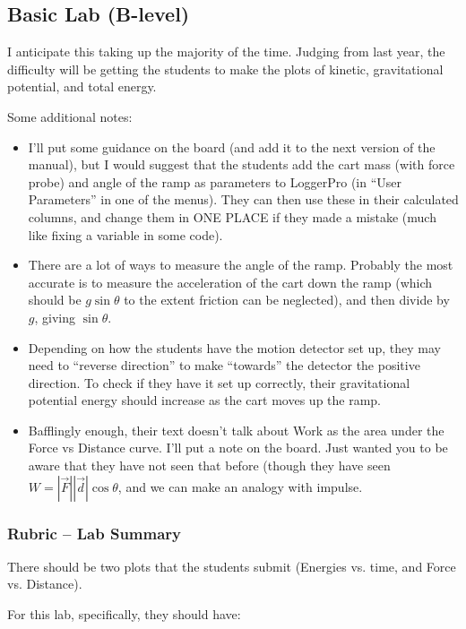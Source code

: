 \documentclass[fleqn,letterpaper]{article}
\begin{document}
\subsection*{Basic Lab (B-level)}

I anticipate this taking up the majority of the time.  Judging from last year, the difficulty will be getting the students to make the plots of kinetic, gravitational potential, and total energy.

Some additional notes:

\begin{itemize}
\item{I'll put some guidance on the board (and add it to the next version of the manual), but I would suggest that the students add the cart mass (with force probe) and angle of the ramp as parameters to LoggerPro (in ``User Parameters'' in one of the menus).  They can then use these in their calculated columns, and change them in ONE PLACE if they made a mistake (much like fixing a variable in some code).}
\item{There are a lot of ways to measure the angle of the ramp.  Probably the most accurate is to measure the acceleration of the cart down the ramp (which should be $g \sin \theta$ to the extent friction can be neglected), and then divide by $g$, giving $\sin \theta$.}
\item{Depending on how the students have the motion detector set up, they may need to ``reverse direction'' to make ``towards'' the detector the positive direction.  To check if they have it set up correctly, their gravitational potential energy should increase as the cart moves up the ramp.}
\item{Bafflingly enough, their text doesn't talk about Work as the area under the Force vs Distance curve.  I'll put a note on the board.  Just wanted you to be aware that they have not seen that before (though they have seen $W = |\vec{F}| |\vec{d}| \cos \theta$, and we can make an analogy with impulse.}
\end{itemize}

\subsubsection*{Rubric -- Lab Summary}

There should be two plots that the students submit (Energies vs. time, and Force vs. Distance).

For this lab, specifically, they should have:
\end{document}
